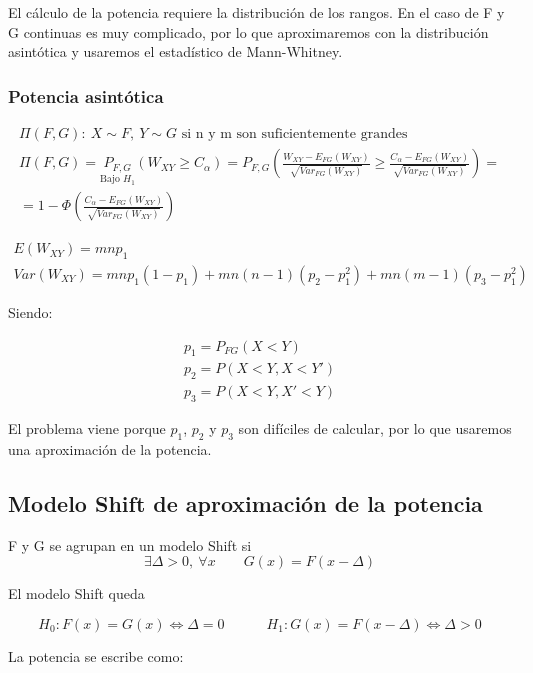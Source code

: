 El cálculo de la potencia requiere la distribución de los rangos. En el caso de F y G continuas es muy complicado, por lo que aproximaremos con la distribución asintótica y usaremos el estadístico de Mann-Whitney.

\subsubsection{Potencia asintótica}
$$
\begin{array}{c}
    \Pi(F,G):\ X\sim F,\ Y\sim G\text{ si n y m son suficientemente grandes} \\
    \Pi(F,G)=\underset{\text{Bajo }H_1}{P_{F,G}}(W_{XY}\geq C_\alpha)=P_{F,G}\left(\frac{W_{XY}-E_{FG}(W_{XY})}{\sqrt{Var_{FG}(W_{XY})}}\geq \frac{C_\alpha-E_{FG}(W_{XY})}{\sqrt{Var_{FG}(W_{XY})}}\right)=\\
    =1-\Phi\left(\frac{C_\alpha-E_{FG}(W_{XY})}{\sqrt{Var_{FG}(W_{XY})}}\right)
\end{array}
$$

$$
\begin{array}{c}
    E(W_{XY})=mnp_1\\
    Var(W_{XY})=mnp_1(1-p_1)+mn(n-1)(p_2-p_1^2)+mn(m-1)(p_3-p_1^2)
\end{array}
$$

Siendo:

$$
\begin{array}{c}
    p_1=P_{FG}(X<Y)\\
    p_2=P(X<Y,X<Y')\\
    p_3=P(X<Y,X'<Y)
\end{array}
$$

El problema viene porque $p_1$, $p_2$ y $p_3$ son difíciles de calcular, por lo que usaremos una aproximación de la potencia.

\subsection{Modelo Shift de aproximación de la potencia}

\begin{theorem}
    F y G se agrupan en un modelo Shift si
    $$
    \exists\Delta>0,\ \forall x\quad\quad G(x)=F(x-\Delta)
    $$
\end{theorem}

El modelo Shift queda

$$
H_0:F(x)=G(x)\iff\Delta=0\quad\quad\quad H_1:G(x)=F(x-\Delta)\iff\Delta>0
$$

La potencia se escribe como:


